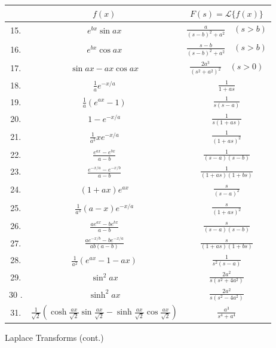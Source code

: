 \documentclass[10pt]{article}
\begin{document}
\begin{center}
\begin{tabular}{|c|c|c|}
\hline
 & $f(x)$ & $F(s)=\mathscr{L}\{f(x)\}$ \\
\hline
15. & $e^{b x} \sin a x$ & $\frac{a}{(s-b)^{2}+a^{2}} \quad(s>b)$ \\
\hline
16. & $e^{b x} \cos a x$ & $\frac{s-b}{(s-b)^{2}+a^{2}} \quad(s>b)$ \\
\hline
17. & $\sin a x-a x \cos a x$ & $\frac{2 a^{3}}{\left(s^{2}+a^{2}\right)^{2}} \quad(s>0)$ \\
\hline
18. & $\frac{1}{a} e^{-x / a}$ & $\frac{1}{1+a s}$ \\
\hline
19. & $\frac{1}{a}\left(e^{a x}-1\right)$ & $\frac{1}{s(s-a)}$ \\
\hline
20. & $1-e^{-x / a}$ & $\frac{1}{s(1+a s)}$ \\
\hline
21. & $\frac{1}{a^{2}} x e^{-x / a}$ & $\frac{1}{(1+a s)^{2}}$ \\
\hline
22. & $\frac{e^{a x}-e^{b x}}{a-b}$ & $\frac{1}{(s-a)(s-b)}$ \\
\hline
23. & $\frac{e^{-x / a}-e^{-x / b}}{a-b}$ & $\frac{1}{(1+a s)(1+b s)}$ \\
\hline
24. & $(1+a x) e^{a x}$ & $\frac{s}{(s-a)^{2}}$ \\
\hline
25. & $\frac{1}{a^{3}}(a-x) e^{-x / a}$ & $\frac{s}{(1+a s)^{2}}$ \\
\hline
26. & $\frac{a e^{a x}-b e^{b x}}{a-b}$ & $\frac{s}{(s-a)(s-b)}$ \\
\hline
27. & $\frac{a e^{-x / b}-b e^{-x / a}}{a b(a-b)}$ & $\frac{s}{(1+a s)(1+b s)}$ \\
\hline
28. & $\frac{1}{a^{2}}\left(e^{a x}-1-a x\right)$ & $\frac{1}{s^{2}(s-a)}$ \\
\hline
29. & $\sin ^{2} a x$ & $\frac{2 a^{2}}{s\left(s^{2}+4 a^{2}\right)}$ \\
\hline
30 . & $\sinh ^{2} a x$ & $\frac{2 a^{2}}{s\left(s^{2}-4 a^{2}\right)}$ \\
\hline
31. & $\frac{1}{\sqrt{2}}\left(\cosh \frac{a x}{\sqrt{2}} \sin \frac{a x}{\sqrt{2}}-\sinh \frac{a x}{\sqrt{2}} \cos \frac{a x}{\sqrt{2}}\right)$ & $\frac{a^{3}}{s^{4}+a^{4}}$ \\
\hline
\end{tabular}
\end{center}

Laplace Transforms (cont.)
\end{document}
